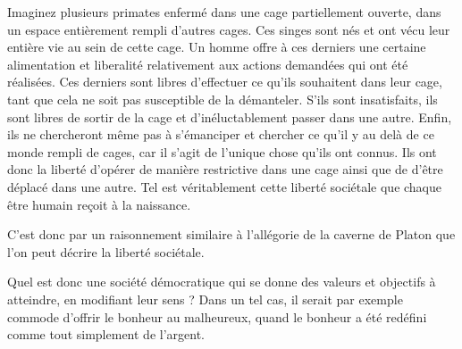 \documentclass[]{cls/tools}
\begin{document}
Imaginez plusieurs primates enfermé dans une cage partiellement ouverte, dans un espace entièrement rempli d'autres cages. Ces singes sont nés et ont vécu 
leur entière vie au sein de cette cage. Un homme offre à ces derniers une 
certaine alimentation et liberalité relativement aux actions demandées qui ont été réalisées. Ces derniers sont libres d'effectuer ce 
qu'ils souhaitent dans leur cage, tant que cela ne soit pas susceptible de la démanteler. S'ils sont insatisfaits, ils sont libres de sortir 
de la cage et d'inéluctablement passer dans une autre. Enfin, ils ne chercheront même pas à s'émanciper et chercher ce qu'il y au delà de ce monde 
rempli de cages, car il s'agit de l'unique chose qu'ils ont connus. Ils ont donc la liberté d'opérer de manière restrictive dans une cage ainsi que de d'être déplacé dans une autre. Tel est véritablement cette liberté 
sociétale que chaque être humain reçoit à la naissance.\newline

C'est donc par un raisonnement similaire à l'allégorie de la caverne de Platon que l'on peut décrire la liberté sociétale.

Quel est donc une société démocratique qui se donne des valeurs et objectifs à atteindre, en modifiant leur sens ? 
Dans un tel cas, il serait par exemple commode d'offrir le bonheur au malheureux, quand le bonheur a été redéfini comme tout simplement
de l'argent.\newline
\end{document}
